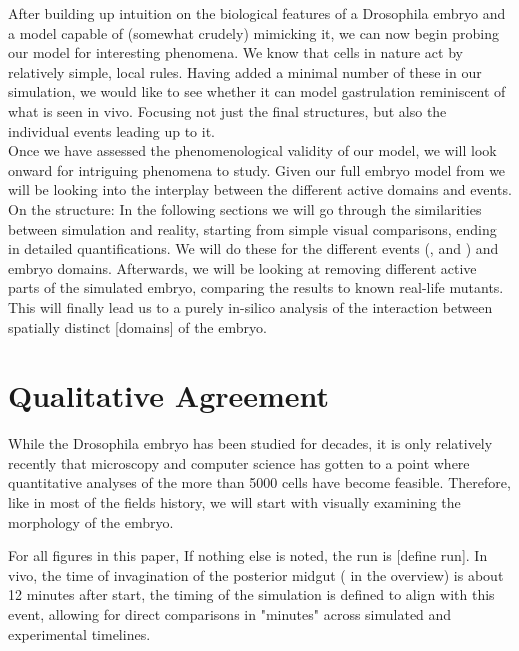 After building up intuition on the biological features of a Drosophila embryo and a model capable of (somewhat crudely) mimicking it, we can now begin probing our model for interesting phenomena. We know that cells in nature act by relatively simple, local rules. Having added a minimal number of these in our simulation, we would like to see whether it can model gastrulation reminiscent of what is seen in vivo. Focusing not just the final structures, but also the individual events leading up to it. \\

Once we have assessed the phenomenological validity of our model, we will look onward for intriguing phenomena to study. Given our full embryo model from we will be looking into the interplay between the different active domains and events.\\


On the structure: In the following sections we will go through the similarities between simulation and reality, starting from simple visual comparisons, ending in detailed quantifications. We will do these for the different events (,  and ) and embryo domains. Afterwards, we will be looking at removing different active parts of the simulated embryo, comparing the results to known real-life mutants. This will finally lead us to a purely in-silico analysis of the interaction between spatially distinct [domains] of the embryo.\\ 

\renewcommand{\contentsname}{Results Section Table of Contents}
 \setcounter{tocdepth}{3}
\localtableofcontents
\renewcommand{\contentsname}{Table of Contents}
 \setcounter{tocdepth}{1} 


\newpage

\section{Qualitative Agreement}
While the Drosophila embryo has been studied for decades, it is only relatively recently that microscopy and computer science has gotten to a point where quantitative analyses of the more than 5000 cells have become feasible. Therefore, like in most of the fields history, we will start with visually examining the morphology of the embryo. 

For all figures in this paper, If nothing else is noted, the run is [define run]. In vivo, the time of invagination of the posterior midgut ( in the overview) is about 12 minutes after start, the timing of the simulation is defined to align with this event, allowing for direct comparisons in "minutes" across simulated and experimental timelines.\\


